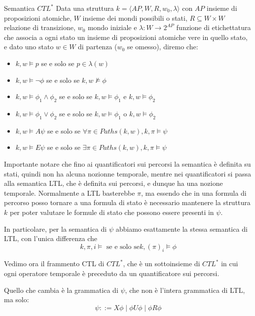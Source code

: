 \begin{definition}{Semantica \(CTL^*\)}
  Data una struttura \(k = \langle AP, W, R, w_0, \lambda \rangle\) con \(AP\) insieme di proposizioni atomiche, \(W\) insieme dei mondi possibili o stati, \(R \subseteq W\times W\) relazione di transizione, \(w_0\) mondo iniziale e \(\lambda: W \to 2^{AP}\) funzione di etichettatura che associa a ogni stato un insieme di proposizioni atomiche vere in quello stato, e dato uno stato \(w \in W\) di partenza (\(w_0\) se omesso), diremo che:
  \begin{itemize}
    \item \(k,w \models p\) se e solo se \(p \in \lambda(w)\)
    \item \(k,w \models \neg \phi\) se e solo se \(k,w \not\models \phi\)
    \item \(k,w \models \phi_1 \land \phi_2\) se e solo se \(k,w \models \phi_1\) e \(k,w \models \phi_2\)
    \item \(k,w \models \phi_1 \lor \phi_2\) se e solo se \(k,w \models \phi_1\) o \(k,w \models \phi_2\)
    \item \(k,w \models A\psi\) se e solo se \(\forall \pi \in Paths(k,w), k,\pi \models \psi\)
    \item \(k,w \models E\psi\) se e solo se \(\exists \pi \in Paths(k,w), k,\pi \models \psi\)
  \end{itemize}
  Importante notare che fino ai quantificatori sui percorsi la semantica è definita su stati, quindi non ha alcuna nozionne temporale, mentre nei quantificatori si passa alla semantica LTL\@, che è definita sui percorsi, e dunque ha una nozione temporale. Normalmente a LTL basterebbe \(\pi\), ma essendo che in una formula di percorso posso tornare a una formula di stato è necessario mantenere la struttura \(k\) per poter valutare le formule di stato che possono essere presenti in \(\psi\).

  In particolare, per la semantica di \(\psi\) abbiamo esattamente la stessa semantica di LTL\@, con l'unica differenza che
  \[k, \pi, i\models \text{ se e solo se} k,{(\pi)}_i\models \phi\]
\end{definition}

Vedimo ora il frammento CTL di \(CTL^*\), che è un sottoinsieme di \(CTL^*\) in cui ogni operatore temporale è preceduto da un quantificatore sui percorsi.

Quello che cambia è la grammatica di \(\psi\), che non è l'intera grammatica di LTL\@, ma solo:
\[\psi ::= X\phi \mid \phi U\phi \mid \phi R\phi\]

